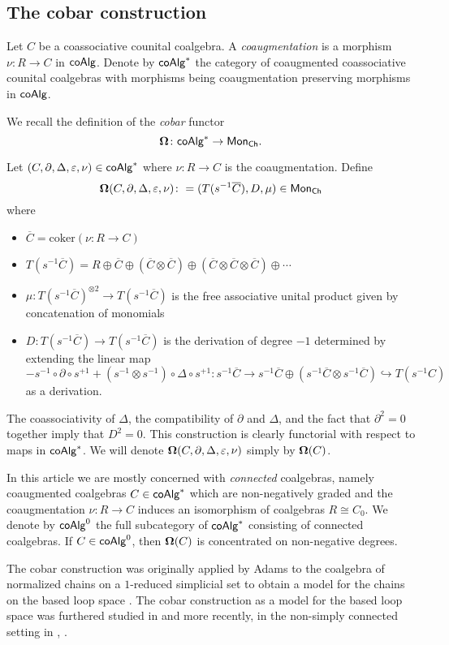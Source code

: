 

\subsection{The cobar construction}

Let $C$ be a coassociative counital coalgebra. A \textit{coaugmentation} is a morphism $\nu \colon R \to C$ in $\mathsf{coAlg}$.
Denote by $\mathsf{coAlg}^*$ the category of coaugmented coassociative counital coalgebras with morphisms being coaugmentation preserving morphisms in $\mathsf{coAlg}$. 

We recall the definition of the \textit{cobar} functor 
$$ \mathbf{\Omega} \colon \mathsf{coAlg}^* \to \mathsf{Mon}_{\mathsf{Ch}}.$$

Let  $(C, \partial, \Delta, \varepsilon, \nu)  \in \mathsf{coAlg}^*$ where $\nu \colon R \to C$ is the coaugmentation. Define
$$ \mathbf{\Omega}(C, \partial, \Delta, \varepsilon, \nu)  \colon= ( T(s^{-1}  \overline{C} ), D, \mu) \in \mathsf{Mon}_{\mathsf{Ch}}$$ where 
\begin{itemize}
\item $\overline{C}=\text{coker}(\nu \colon R \to C)$
\item $T(s^{-1} \overline{C})= R \oplus \overline{C} \oplus (\overline{C}  \otimes \overline{C} ) \oplus ( \overline{C} \otimes \overline{C} \otimes \overline{C} ) \oplus\cdots $
\item $\mu \colon T(s^{-1}  \overline{C} )^{\otimes 2} \to T(s^{-1}  \overline{C} ) $ is the free associative unital product given by concatenation of monomials
\item $D \colon T(s^{-1}  \overline{C} ) \to T(s^{-1}  \overline{C} )$ is the derivation of degree $-1$ determined by extending the linear map $$- s^{-1} \circ \partial \circ s^{+1} + (s^{-1} \otimes s^{-1}) \circ \Delta \circ s^{+1} \colon s^{-1}\overline{C} \to s^{-1}\overline{C} \oplus (s^{-1}\overline{C} \otimes s^{-1}\overline{C}) \hookrightarrow T(s^{-1}C)$$ as a derivation.
\end{itemize}

The coassociativity of $\Delta$, the compatibility of $\partial$ and $\Delta$, and the fact that $\partial^2 =0$ together imply that $D^2=0$. This construction is clearly functorial with respect to maps in $\mathsf{coAlg}^*$. We will denote $ \mathbf{\Omega} (C, \partial, \Delta, \varepsilon, \nu)$ simply by $ \mathbf{\Omega}(C)$. 

In this article we are mostly concerned with \textit{connected} coalgebras, namely coaugmented coalgebras $C \in \mathsf{coAlg}^*$ which are non-negatively graded and the coaugmentation $\nu \colon R \to C$ induces an isomorphism of coalgebras $R \cong C_0$. We denote by $\mathsf{coAlg}^0$ the full subcategory of $\mathsf{coAlg}^*$ consisting of connected coalgebras. If $C \in \mathsf{coAlg}^0$, then $ \mathbf{\Omega}(C)$ is concentrated on non-negative degrees. 

The cobar construction was originally applied by Adams to the coalgebra of normalized chains on a $1$-reduced simplicial set to obtain a model for the chains on the based loop space \cite{Adams}. The cobar construction as a model for the based loop space was furthered studied in \cite{Baues} and more recently, in the non-simply connected setting in \cite{Hess-Tonks}, \cite{rivera-zeinalian-cubical}.
